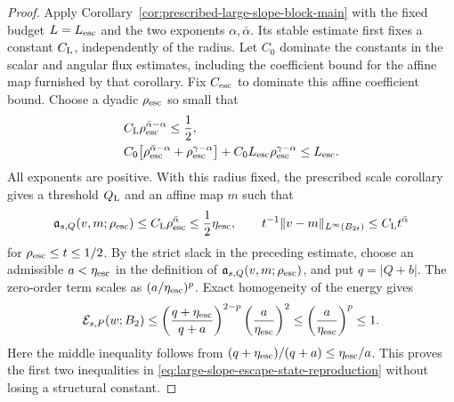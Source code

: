 \documentclass[11pt,reqno]{amsart}
\numberwithin{equation}{section}
\theoremstyle{remark}
\begin{document}
\begin{proof}
Apply Corollary~\ref{cor:prescribed-large-slope-block-main} with the
fixed budget \(L=L_{\rm esc}\) and the two exponents
\(\alpha,\bar\alpha\).  Its stable estimate first fixes a constant
\(C_{\rm L}\), independently of the radius.  Let \(C_0\) dominate the
constants in the scalar and angular flux estimates, including the
coefficient bound for the affine map furnished by that corollary.
Fix \(C_{\rm esc}\) to dominate this affine coefficient bound.
Choose a dyadic \(\rho_{\rm esc}\) so small that
\begin{align}
& C_{\rm L}\rho_{\rm esc}^{\bar\alpha-\alpha}\le\frac12,
 \label{eq:escape-large-slope-endpoint}\\
& C_0\bigl[\rho_{\rm esc}^{\bar\alpha-\alpha}
 +\rho_{\rm esc}^{\gamma-\alpha}\bigr]+C_0L_{\rm esc}\rho_{\rm esc}^{\gamma-\alpha}
 \le L_{\rm esc}.
 \label{eq:escape-large-slope-tail-budget}
\end{align}
All exponents are positive.  With this radius fixed, the prescribed
scale corollary gives a threshold \(Q_{\rm L}\) and an affine map \(m\)
such that
\[
 \mathfrak a_{s,Q}(v,m;\rho_{\rm esc})
 \le C_{\rm L}\rho_{\rm esc}^{\bar\alpha}
 \le\frac12\eta_{\rm esc},
\qquad
 t^{-1}\|v-m\|_{L^\infty(B_{2t})}
 \le C_{\rm L}t^{\bar\alpha}
\]
for \(\rho_{\rm esc}\le t\le1/2\).  By the strict slack in the
preceding estimate, choose an admissible \(a<\eta_{\rm esc}\) in the
definition of \(\mathfrak a_{s,Q}(v,m;\rho_{\rm esc})\), and put
\(q=|Q+b|\).  The zero-order term scales as
\((a/\eta_{\rm esc})^p\).  Exact
homogeneity of the energy gives
\begin{equation*}
 \mathcal E_{s,P}(w;B_2)
 \le
 \left(\frac{q+\eta_{\rm esc}}{q+a}\right)^{2-p}
 \left(\frac a{\eta_{\rm esc}}\right)^2
 \le\left(\frac a{\eta_{\rm esc}}\right)^p\le1.
\end{equation*}
Here the middle inequality follows from
\((q+\eta_{\rm esc})/(q+a)\le\eta_{\rm esc}/a\).  This proves the
first two inequalities in
\eqref{eq:large-slope-escape-state-reproduction} without losing a
structural constant.


\end{proof}
\end{document}

